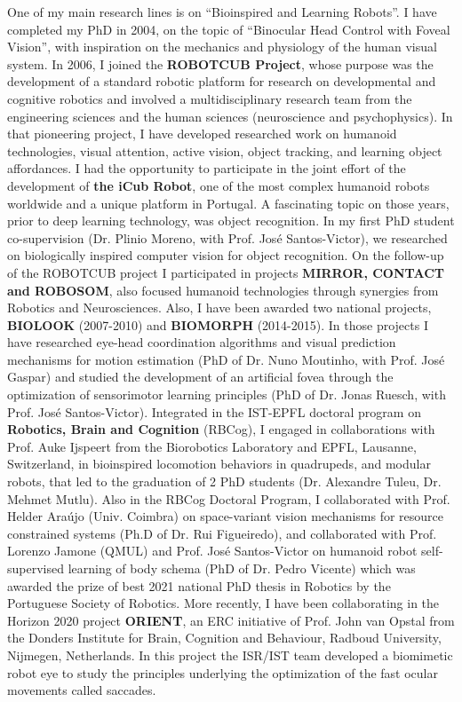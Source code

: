 One of my main research lines is on ``Bioinspired and Learning Robots''.
I have completed my PhD in 2004, on the topic of ``Binocular Head
Control with Foveal Vision'', with inspiration on the mechanics and
physiology of the human visual system. In 2006, I joined the
\textbf{ROBOTCUB Project}, whose purpose was the development of a
standard robotic platform for research on developmental and cognitive
robotics and involved a multidisciplinary research team from the
engineering sciences and the human sciences (neuroscience and
psychophysics). In that pioneering project, I have developed researched
work on humanoid technologies, visual attention, active vision, object
tracking, and learning object affordances. I had the opportunity to
participate in the joint effort of the development of \textbf{the iCub
Robot}, one of the most complex humanoid robots worldwide and a unique
platform in Portugal. A fascinating topic on those years, prior to deep
learning technology, was object recognition. In my first PhD student
co-supervision (Dr. Plinio Moreno, with Prof. José Santos-Victor), we
researched on biologically inspired computer vision for object
recognition. On the follow-up of the ROBOTCUB project I participated in
projects \textbf{MIRROR, CONTACT and ROBOSOM}, also focused humanoid
technologies through synergies from Robotics and Neurosciences. Also, I
have been awarded two national projects, \textbf{BIOLOOK} (2007-2010)
and \textbf{BIOMORPH} (2014-2015). In those projects I have researched
eye-head coordination algorithms and visual prediction mechanisms for
motion estimation (PhD of Dr. Nuno Moutinho, with Prof. José Gaspar) and
studied the development of an artificial fovea through the optimization
of sensorimotor learning principles (PhD of Dr. Jonas Ruesch, with Prof.
José Santos-Victor). Integrated in the IST-EPFL doctoral program on
\textbf{Robotics, Brain and Cognition} (RBCog), I engaged in
collaborations with Prof. Auke Ijspeert from the Biorobotics Laboratory
and EPFL, Lausanne, Switzerland, in bioinspired locomotion behaviors in
quadrupeds, and modular robots, that led to the graduation of 2 PhD
students (Dr. Alexandre Tuleu, Dr. Mehmet Mutlu). Also in the RBCog
Doctoral Program, I collaborated with Prof. Helder Araújo (Univ.
Coimbra) on space-variant vision mechanisms for resource constrained
systems (Ph.D of Dr. Rui Figueiredo), and collaborated with Prof.
Lorenzo Jamone (QMUL) and Prof. José Santos-Victor on humanoid robot
self-supervised learning of body schema (PhD of Dr. Pedro Vicente) which
was awarded the prize of best 2021 national PhD thesis in Robotics by
the Portuguese Society of Robotics. More recently, I have been
collaborating in the Horizon 2020 project \textbf{ORIENT}, an ERC
initiative of Prof. John van Opstal from the Donders Institute for
Brain, Cognition and Behaviour, Radboud University, Nijmegen,
Netherlands. In this project the ISR/IST team developed a biomimetic
robot eye to study the principles underlying the optimization of the
fast ocular movements called saccades.

